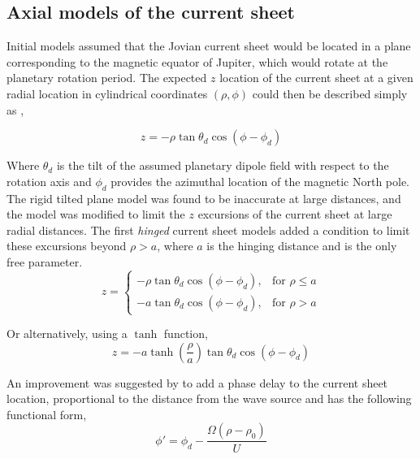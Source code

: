 \subsection{Axial models of the current sheet}
Initial models assumed that the Jovian current sheet would be located in a plane corresponding to the magnetic equator of Jupiter, which would rotate at the planetary rotation period. The expected $z$ location of the current sheet at a given radial location in cylindrical coordinates $(\rho, \phi)$ could then be described simply as \cite{VanAllen1974EnergeticJupiter,Goertz1976TheMagnetosphere},

\begin{equation}
    z = -\rho \tan\theta_d \cos\left(\phi - \phi_d\right)
\end{equation}

Where $\theta_d$ is the tilt of the assumed planetary dipole field with respect to the rotation axis and $\phi_d$ provides the azimuthal location of the magnetic North pole. The rigid tilted plane model was found to be inaccurate at large distances, and the model was modified to limit the $z$ excursions of the current sheet at large radial distances. The first \emph{hinged} current sheet models \cite{Smith1974The10,Hill1974ConfigurationMagnetosphere} added a condition to limit these excursions beyond $\rho > a$, where $a$ is the hinging distance and is the only free parameter.
\begin{equation}
    z = \begin{cases}
    -\rho \tan\theta_d \cos\left(\phi - \phi_d\right), & \text{for } \rho \leq a\\
    -a \tan\theta_d \cos\left(\phi - \phi_d\right), & \text{for } \rho > a
    \end{cases}
\end{equation}

Or alternatively, using a $\tanh$ function, 
\begin{equation}
    z = -a \tanh\left(\frac{\rho}{a}\right) \tan\theta_d \cos\left(\phi - \phi_d\right)
\end{equation}

An improvement was suggested by  to add a phase delay to the current sheet location, proportional to the distance from the wave source and has the following functional form,
\begin{equation}
    \phi' = \phi_d - \frac{\Omega \left( \rho - \rho_0\right)}{U}
\end{equation}

